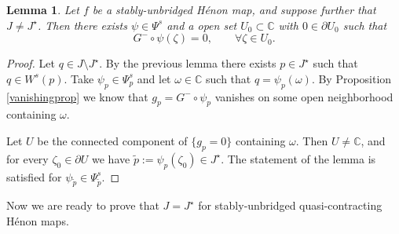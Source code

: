 \documentclass[10pt,a4paper]{article}
\newtheorem{lemma}[theorem]{Lemma}
\begin{document}
\begin{lemma}
Let $f$ be a stably-unbridged H\'enon map, and suppose further that $J\neq J^\star$. Then there exists $\psi\in\Psi^s$  and a open set $U_0\subset \mathbb C$ with $0\in\partial U_0$ such that
\[
G^-\circ \psi(\zeta)=0,\qquad \forall \zeta\in U_0.
\]
\end{lemma}
\begin{proof}
Let $q\in J\setminus J^\star$. By the previous lemma there exists $p\in J^\star$ such that $q\in W^s(p)$. Take $\psi_p\in\Psi_p^s$ and let $\omega\in \mathbb C$ such that $q=\psi_p(\omega)$. By Proposition \ref{vanishingprop} we know that $g_p=G^-\circ\psi_p$ vanishes on some open neighborhood containing $\omega$.

Let $U$ be the connected component  of $\{g_p=0\}$ containing $\omega$. Then $U\neq\mathbb C$, and for every $\zeta_0\in\partial U$ we have $\tilde p:=\psi_p(\zeta_0)\in J^\star$. The statement of the lemma is satisfied for $\psi_{\tilde p}\in\Psi_{\tilde p}^s$.
\end{proof}

Now we are ready to prove that $J = J^\star$ for stably-unbridged quasi-contracting H\'enon maps.
\end{document}
